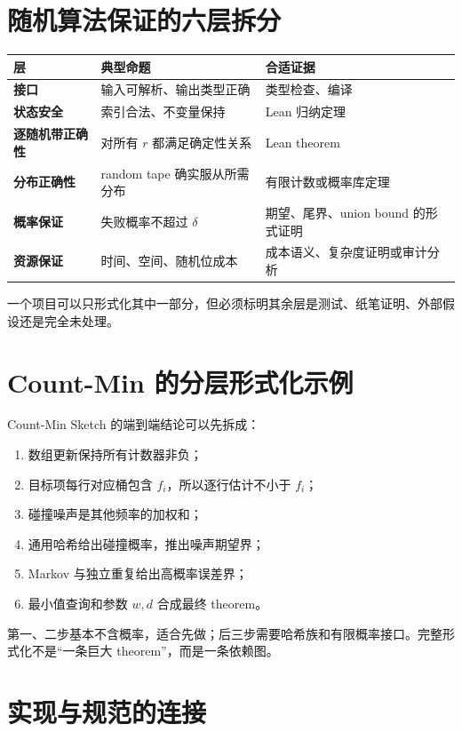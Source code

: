 \section{随机算法保证的六层拆分}

\begin{center}
\begin{tabularx}{0.96\textwidth}{>{\bfseries}lX X}
\toprule
层 & 典型命题 & 合适证据 \\
\midrule
接口 & 输入可解析、输出类型正确 & 类型检查、编译 \\
状态安全 & 索引合法、不变量保持 & Lean 归纳定理 \\
逐随机带正确性 & 对所有 $r$ 都满足确定性关系 & Lean theorem \\
分布正确性 & random tape 确实服从所需分布 & 有限计数或概率库定理 \\
概率保证 & 失败概率不超过 $\delta$ & 期望、尾界、union bound 的形式证明 \\
资源保证 & 时间、空间、随机位成本 & 成本语义、复杂度证明或审计分析 \\
\bottomrule
\end{tabularx}
\end{center}

一个项目可以只形式化其中一部分，但必须标明其余层是测试、纸笔证明、外部假设还是完全未处理。

\section{Count-Min 的分层形式化示例}

Count-Min Sketch 的端到端结论可以先拆成：
\begin{enumerate}
  \item 数组更新保持所有计数器非负；
  \item 目标项每行对应桶包含 $f_i$，所以逐行估计不小于 $f_i$；
  \item 碰撞噪声是其他频率的加权和；
  \item 通用哈希给出碰撞概率，推出噪声期望界；
  \item Markov 与独立重复给出高概率误差界；
  \item 最小值查询和参数 $w,d$ 合成最终 theorem。
\end{enumerate}
第一、二步基本不含概率，适合先做；后三步需要哈希族和有限概率接口。完整形式化不是“一条巨大 theorem”，而是一条依赖图。

\section{实现与规范的连接}

